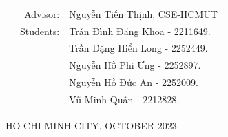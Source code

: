 \documentclass[a4paper]{article}
\begin{document}
\begin{titlepage}
\begin{table}[h]
	\begin{tabular}{rrl}
		\hspace{5 cm} & Advisor: & Nguyễn Tiến Thịnh, CSE-HCMUT\\[6pt]
		& Students: & Trần Đình Đăng Khoa \hspace*{0.05cm} - 2211649. \\
		& 			& Trần Đặng Hiển Long \hspace*{0.15cm} - 2252449. \\
		& 			& Nguyễn Hồ Phi Ưng	  \hspace*{0.41cm} - 2252897. \\
		& 			& Nguyễn Hồ Đức An 	  \hspace*{0.5cm} - 2252009. \\
		& 			& Vũ Minh Quân		  \hspace*{1.2cm} - 2212828. \\
	\end{tabular}
\end{table}

\vspace*{1cm}

\begin{center}
{\footnotesize HO CHI MINH CITY, OCTOBER 2023}
\end{center}
\end{titlepage}


\newpage
\tableofcontents








\clearpage


\nocite{*}
\end{document}
